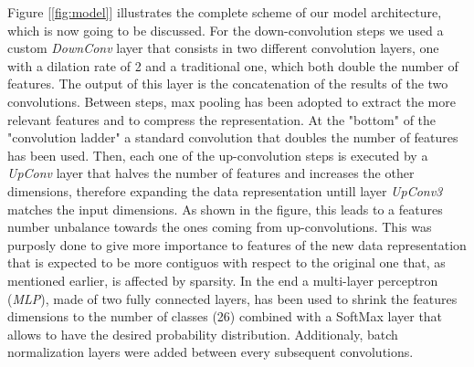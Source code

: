 Figure [\ref{fig:model}] illustrates the complete scheme of our model architecture, which is now going to be discussed.
For the down-convolution steps we used a custom \textit{DownConv} layer that consists in two different
convolution layers, one with a dilation rate of 2 and a traditional one, which both double the number of features. 
The output of this layer is the concatenation of the results of the two convolutions.
Between steps, max pooling has been adopted to extract the more relevant features and to compress the representation.
At the "bottom" of the "convolution ladder" a standard convolution that doubles the number of features has been used.
Then, each one of the up-convolution steps is executed by a \textit{UpConv} layer that halves the number of features
and increases the other dimensions, therefore expanding the data representation untill layer \textit{UpConv3} matches the input dimensions.
As shown in the figure, this leads to a features number unbalance towards the ones coming from up-convolutions.
This was purposly done to give more importance to features of the new data representation that is expected to be more 
contiguos with respect to the original one that, as mentioned earlier, is affected by sparsity.
In the end a multi-layer perceptron (\textit{MLP}), made of two fully connected layers, has been used
to shrink the features dimensions to the number of classes (26) combined with a SoftMax layer that allows
to have the desired probability distribution.
Additionaly, batch normalization layers were added between every subsequent convolutions.
